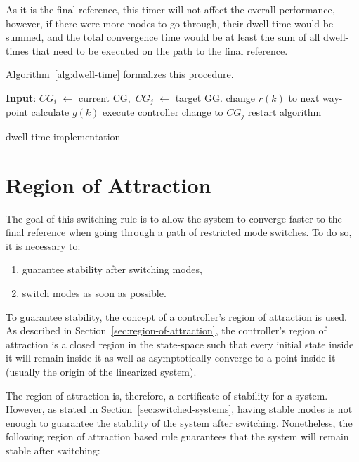 As it is the final reference, this timer will not affect the overall
performance, however, if there were more modes to go through, their dwell time
would be summed, and the total convergence time would be at least the sum of all
dwell-times that need to be executed on the path to the final reference.

Algorithm~\ref{alg:dwell-time} formalizes this procedure.

\begin{algorithm}[H]
	\begin{algorithmic}[1]
		\State{}\textbf{Input}: \(CG_i\) \(\leftarrow{}\) current CG,~\(CG_j\) \(\leftarrow{}\) target GG.\@
		\State{}change \(r(k)\) to next way-point
			\State{}calculate \(g(k)\)
			\State{}execute controller
		\EndWhile{}
		\State{}change to \(CG_j\)
		\State{}restart algorithm
	\end{algorithmic}
	\caption{dwell-time implementation}%
	\label{alg:dwell-time}
\end{algorithm}

\section{Region of Attraction}%
\label{sec:roa-switching-rule}

The goal of this switching rule is to allow the system to converge faster to the
final reference when going through a path of restricted mode switches. To do so,
it is necessary to:

\begin{enumerate}
	\item guarantee stability after switching modes,
	\item switch modes as soon as possible.
\end{enumerate}

To guarantee stability, the concept of a controller's region of attraction is
used. As described in Section~\ref{sec:region-of-attraction}, the controller's
region of attraction is a closed region in the state-space such that every
initial state inside it will remain inside it as well as asymptotically converge
to a point inside it (usually the origin of the linearized system).

The region of attraction is, therefore, a certificate of stability for a system.
However, as stated in Section~\ref{sec:switched-systems}, having stable modes is
not enough to guarantee the stability of the system after switching.
Nonetheless, the following region of attraction based rule guarantees that the
system will remain stable after switching:

